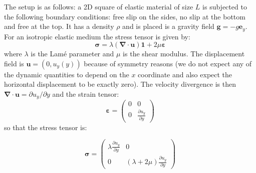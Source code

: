 The setup is as follows: a 2D square of elastic material of size $L$ is 
subjected to the following boundary conditions: free slip on the sides, no slip at the 
bottom and free at the top. It has a density $\rho$ and is placed is a gravity 
field ${\bm g}=-g {\bm e}_y$.
For an isotropic elastic medium the stress tensor is given by:
\[
{\bm \sigma} = \lambda ({\bm \nabla}\cdot{\bm u}) {\bm 1} + 2 \mu {\bm \varepsilon}
\]
where $\lambda$ is the Lam{\'e} parameter and $\mu$ is the shear modulus.
The displacement field is ${\bm u}=(0,u_y(y))$ because of symmetry reasons 
(we do not expect any of the dynamic quantities to depend on the $x$ coordinate and 
also expect the horizontal displacement to be exactly zero).
The velocity divergence is then ${\bm \nabla}\cdot{\bm u} = \partial u_y/\partial y$
and the strain tensor:
\[
{\bm \varepsilon}
=
\left(
\begin{array}{cc}
0 & 0 \\
0 & \frac{\partial u_y}{\partial y}
\end{array}
\right)
\]
so that the stress tensor is:

\[
{\bm \sigma} =
\left(
\begin{array}{cc}
\lambda \frac{\partial u_y}{\partial y} &  0 \\
0 & (\lambda + 2 \mu) \frac{\partial u_y}{\partial y}
\end{array}
\right)
\]

